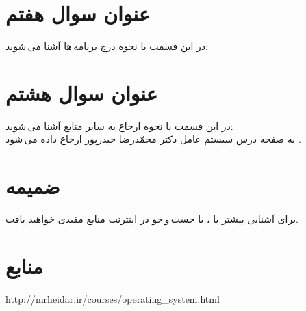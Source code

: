 \documentclass{article}
\begin{document}
\section{عنوان سوال هفتم}
در این قسمت با نحوه درج برنامه\,ها آشنا می\,شوید:
\lr{}

\section{عنوان سوال هشتم}
در این قسمت با نحوه ارجاع به سایر منابع آشنا می\,شوید:\\
\indent
به صفحه درس سیستم عامل دکتر محمّدرضا حیدرپور ارجاع داده می\,شود \cite{b1}.

\section{ضمیمه}
برای آشنایی بیشتر با \lr{\LaTeX}، با جست\,و\,جو در اینترنت منابع مفیدی خواهید یافت.


\section*{منابع}
\renewcommand{\section}[2]{}%
\begin{thebibliography}{99} %


\begin{LTRitems}

\resetlatinfont

 http://mrheidar.ir/courses/operating\_system.html
\end{LTRitems}

\end{thebibliography}
\end{document}

